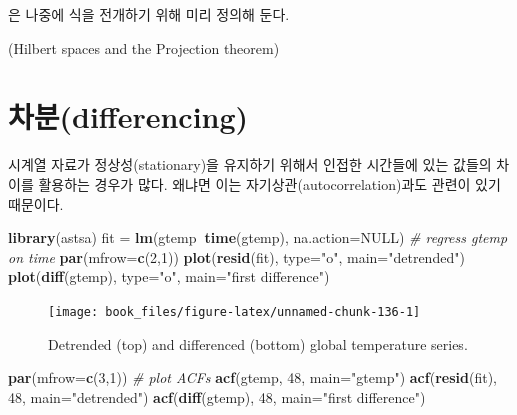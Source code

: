 \documentclass[b5paper,]{scrbook}
\makeatletter
\newenvironment{Shaded}{\begin{snugshade}}{\end{snugshade}}
\newcommand{\KeywordTok}[1]{\textcolor[rgb]{0.13,0.29,0.53}{\textbf{#1}}}
\newcommand{\DataTypeTok}[1]{\textcolor[rgb]{0.13,0.29,0.53}{#1}}
\newcommand{\DecValTok}[1]{\textcolor[rgb]{0.00,0.00,0.81}{#1}}
\newcommand{\StringTok}[1]{\textcolor[rgb]{0.31,0.60,0.02}{#1}}
\newcommand{\CommentTok}[1]{\textcolor[rgb]{0.56,0.35,0.01}{\textit{#1}}}
\newcommand{\OtherTok}[1]{\textcolor[rgb]{0.56,0.35,0.01}{#1}}
\newcommand{\OperatorTok}[1]{\textcolor[rgb]{0.81,0.36,0.00}{\textbf{#1}}}
\newcommand{\NormalTok}[1]{#1}
\theoremstyle{plain}
\theoremstyle{definition}
\numberwithin{equation}{section}
\newenvironment{kframe}{%
\medskip{}
\setlength{\fboxsep}{.8em}
 \def\at@end@of@kframe{}%
 \ifinner\ifhmode%
  \def\at@end@of@kframe{\end{minipage}}%
  \begin{minipage}{\columnwidth}%
 \fi\fi%
 \def\FrameCommand##1{\hskip\@totalleftmargin \hskip-\fboxsep
 \colorbox{shadecolor}{##1}\hskip-\fboxsep
     \hskip-\linewidth \hskip-\@totalleftmargin \hskip\columnwidth}%
 \MakeFramed {\advance\hsize-\width
   \@totalleftmargin\z@ \linewidth\hsize
   \@setminipage}}%
 {\par\unskip\endMakeFramed%
 \at@end@of@kframe}
\renewenvironment{Shaded}{\begin{kframe}}{\end{kframe}}
\makeatother
\begin{document}
은 나중에 식을 전개하기 위해 미리 정의해 둔다.

(Hilbert spaces and the Projection theorem)

\section{차분(differencing)}\label{differencing}

시계열 자료가 정상성(stationary)을 유지하기 위해서 인접한 시간들에 있는
값들의 차이를 활용하는 경우가 많다. 왜냐면 이는
자기상관(autocorrelation)과도 관련이 있기 때문이다.

\begin{Shaded}
\begin{Highlighting}[]
\KeywordTok{library}\NormalTok{(astsa)}
\NormalTok{fit =}\StringTok{ }\KeywordTok{lm}\NormalTok{(gtemp}\OperatorTok{~}\KeywordTok{time}\NormalTok{(gtemp), }\DataTypeTok{na.action=}\OtherTok{NULL}\NormalTok{) }\CommentTok{# regress gtemp on time}
\KeywordTok{par}\NormalTok{(}\DataTypeTok{mfrow=}\KeywordTok{c}\NormalTok{(}\DecValTok{2}\NormalTok{,}\DecValTok{1}\NormalTok{))}
\KeywordTok{plot}\NormalTok{(}\KeywordTok{resid}\NormalTok{(fit), }\DataTypeTok{type=}\StringTok{"o"}\NormalTok{, }\DataTypeTok{main=}\StringTok{"detrended"}\NormalTok{)}
\KeywordTok{plot}\NormalTok{(}\KeywordTok{diff}\NormalTok{(gtemp), }\DataTypeTok{type=}\StringTok{"o"}\NormalTok{, }\DataTypeTok{main=}\StringTok{"first difference"}\NormalTok{)}
\end{Highlighting}
\end{Shaded}

\begin{figure}

{\centering \texttt{[image: book\_files/figure-latex/unnamed-chunk-136-1]} 

}

\caption{Detrended (top) and differenced (bottom) global temperature series.}\label{fig:unnamed-chunk-136}
\end{figure}

\begin{Shaded}
\begin{Highlighting}[]
\KeywordTok{par}\NormalTok{(}\DataTypeTok{mfrow=}\KeywordTok{c}\NormalTok{(}\DecValTok{3}\NormalTok{,}\DecValTok{1}\NormalTok{)) }\CommentTok{# plot ACFs}
\KeywordTok{acf}\NormalTok{(gtemp, }\DecValTok{48}\NormalTok{, }\DataTypeTok{main=}\StringTok{"gtemp"}\NormalTok{)}
\KeywordTok{acf}\NormalTok{(}\KeywordTok{resid}\NormalTok{(fit), }\DecValTok{48}\NormalTok{, }\DataTypeTok{main=}\StringTok{"detrended"}\NormalTok{)}
\KeywordTok{acf}\NormalTok{(}\KeywordTok{diff}\NormalTok{(gtemp), }\DecValTok{48}\NormalTok{, }\DataTypeTok{main=}\StringTok{"first difference"}\NormalTok{)}
\end{Highlighting}
\end{Shaded}
\end{document}
